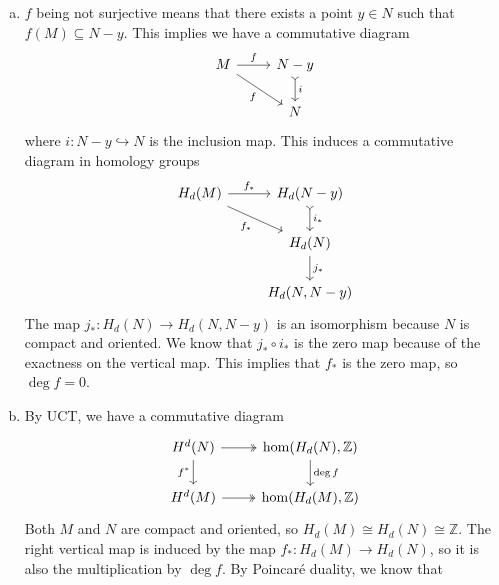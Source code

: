 \documentclass[letterpaper, 12pt]{article}
\begin{document}
\begin{solution}
\begin{enumerate}[(a)]
\item \(f\) being not surjective means that there exists a point \(y\in N\) such that \(f(M)\subseteq N-y\). This implies we have a commutative diagram 
\[\begin{tikzcd}
	M & {N-y} \\
	& N
	\arrow["f", from=1-1, to=1-2]
	\arrow["f"', from=1-1, to=2-2]
	\arrow["i", tail, from=1-2, to=2-2]
\end{tikzcd}\]
where \(i:N-y\hookrightarrow N\) is the inclusion map. This induces a commutative diagram in homology groups 
\[\begin{tikzcd}
	{H_d(M)} & {H_d(N-y)} \\
	& {H_d(N)} \\
	& {H_d(N,N-y)}
	\arrow["{f_*}", from=1-1, to=1-2]
	\arrow["{f_*}"', from=1-1, to=2-2]
	\arrow["{i_*}", tail, from=1-2, to=2-2]
	\arrow["{j_*}", from=2-2, to=3-2]
\end{tikzcd}\]
The map \(j_*:H_d(N)\rightarrow H_d(N,N-y)\) is an isomorphism because \(N\) is compact and oriented. We know that \(j_*\circ i_*\) is the zero map because of the exactness on the vertical map. This implies that \(f_*\) is the zero map, so \(\deg f=0\).
\item By UCT, we have a commutative diagram 
\[\begin{tikzcd}
	{H^d(N)} & {\hom(H_d(N),\mathbb{Z})} \\
	{H^d(M)} & {\hom(H_d(M),\mathbb{Z})}
	\arrow[two heads, from=1-1, to=1-2]
	\arrow["{f^*}"', from=1-1, to=2-1]
	\arrow["{\deg f}", from=1-2, to=2-2]
	\arrow[two heads, from=2-1, to=2-2]
\end{tikzcd}\]
Both \(M\) and \(N\) are compact and oriented, so \(H_d(M)\cong H_d(N)\cong \mathbb{Z}\). The right vertical map is induced by the map \(f_*:H_d(M)\rightarrow H_d(N)\), so it is also the multiplication by \(\deg f\). By Poincaré duality, we know that 

\end{enumerate}
\end{solution}
\end{document}
